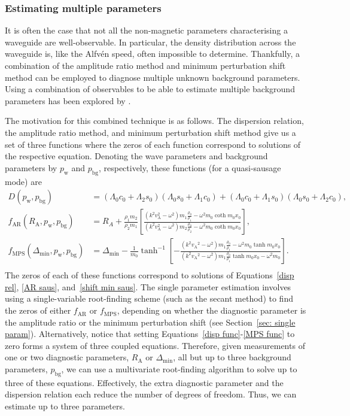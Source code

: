 \subsubsection{Estimating multiple parameters} \label{sec: multiple params}

It is often the case that not all the non-magnetic parameters characterising a waveguide are well-observable. In particular, the density distribution across the waveguide is, like the Alfv\'{e}n speed, often impossible to determine. Thankfully, a combination of the amplitude ratio method and minimum perturbation shift method can be employed to diagnose multiple unknown background parameters. Using a combination of observables to be able to estimate multiple background parameters has been explored by \cite{arr_etal07,Goo_etal08}.

The motivation for this combined technique is as follows. The dispersion relation, the amplitude ratio method, and minimum perturbation shift method give us a set of three functions where the zeros of each function correspond to solutions of the respective equation. Denoting the wave parameters and background parameters by $p_\mathrm{w}$ and $p_\mathrm{bg}$, respectively, these functions (for a quasi-sausage mode) are
\begin{align}
D(p_\mathrm{w}, p_\mathrm{bg}) &= (\Lambda_0c_0 + \Lambda_2s_0)(\Lambda_0s_0 + \Lambda_1c_0) + (\Lambda_0c_0 + \Lambda_1s_0)(\Lambda_0s_0 + \Lambda_2c_0), \label{disp func} \\
f_{\mathrm{AR}}(R_\mathrm{A}, p_\mathrm{w}, p_\mathrm{bg}) &= R_A + \frac{\rho_1m_2}{\rho_2m_1}\left[\frac{(k^2v_\textrm{A}^2 - \omega^2)m_1\frac{\rho_0}{\rho_1} - \omega^2m_0\coth{m_0x_0}}{(k^2v_\textrm{A}^2 - \omega^2)m_2\frac{\rho_0}{\rho_2} - \omega^2m_0\coth{m_0x_0}}\right], \label{AR func} \\
f_{\mathrm{MPS}}(\Delta_\mathrm{min}, p_\mathrm{w}, p_\mathrm{bg}) &= \Delta_\textrm{min} - \frac{1}{m_0}\tanh^{-1}\left[-\frac{(k^2{v_\textrm{A}}^2 - \omega^2)m_1\frac{\rho_0}{\rho_1} - \omega^2{m_0}\tanh{m_0x_0}}{(k^2{v_\textrm{A}}^2 - \omega^2)m_1\frac{\rho_0}{\rho_1}\tanh{m_0x_0} - \omega^2{m_0}}\right]. \label{MPS func} \\
\end{align}
The zeros of each of these functions correspond to solutions of Equations~\eqref{disp rel}, \eqref{AR saus}, and~\eqref{shift min saus}. The single parameter estimation involves using a single-variable root-finding scheme (such as the secant method) to find the zeros of either $f_\mathrm{AR}$ or $f_\mathrm{MPS}$, depending on whether the diagnostic parameter is the amplitude ratio or the minimum perturbation shift (see Section~\ref{sec: single param}). Alternatively, notice that setting Equations~\eqref{disp func}-\eqref{MPS func} to zero forms a system of three coupled equations. Therefore, given measurements of one or two diagnostic parameters, $R_\mathrm{A}$ or $\Delta_\mathrm{min}$, all but up to three background parameters, $p_\mathrm{bg}$, we can use a multivariate root-finding algorithm to solve up to three of these equations. Effectively, the extra diagnostic parameter and the dispersion relation each reduce the number of degrees of freedom. Thus, we can estimate up to three parameters.

